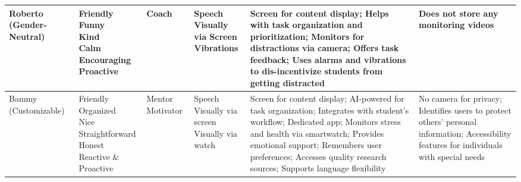 \documentclass[11pt]{article}
\begin{document}
\begin{table}[htbp]
{\begin{tabular}{ m{1.4cm}  m{1.5cm} m{1.1cm} m{2cm}  m{4.5cm} m{4.5cm}}
\midrule
\centering Roberto (Gender-Neutral) & \makecell[l]{Friendly\\ Funny\\ Kind\\ Calm\\ Encouraging\\Proactive} & Coach & \makecell[l]{Speech \\Visually via Screen\\ Vibrations }  & Screen for content display; Helps with task organization and prioritization; Monitors for distractions via camera; Offers task feedback; Uses alarms and vibrations to dis-incentivize students from getting distracted & Does not store any monitoring videos \\
\midrule
\centering Bammy (Customizable) &  \makecell[l]{Friendly\\ Organized\\ Nice\\ Straightforward\\ Honest\\Reactive \& Proactive} & Mentor Motivator & \makecell[l]{Speech\\ Visually via screen\\ Visually via watch } & Screen for content display; AI-powered for task organization; Integrates with student’s workflow; Dedicated app; Monitors stress and health via smartwatch; Provides emotional support; Remembers user preferences; Accesses quality research sources; Supports language flexibility & No camera for privacy; Identifies users to protect others' personal information; Accessibility features for individuals with special needs\\
\bottomrule
\end{tabular}
}
\end{table}
\end{document}
